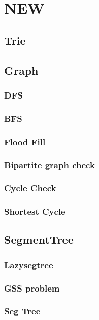 \chapter{NEW}

\section{Trie}

\section{Graph}
	\subsection{DFS}
	\subsection{BFS}
	\subsection{Flood Fill}
	\subsection{Bipartite graph check}
	\subsection{Cycle Check}
	\subsection{Shortest Cycle}

\section{SegmentTree}
	\subsection{Lazysegtree}
	\subsection{GSS problem}
	\subsection{Seg Tree}

